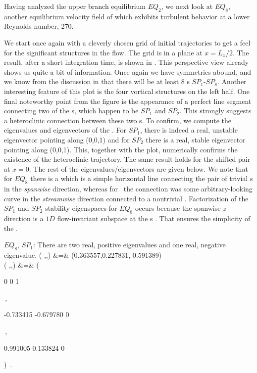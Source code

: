 \documentclass[letter,12pt,openany]{article}
\begin{document}
Having analyzed the upper branch equilibrium $EQ_2$, we next look at 
$EQ_8$, another equilibrium velocity field of {\pCf} which exhibits 
turbulent behavior at a lower Reynolds number, 270.


We start once again with a cleverly chosen grid of initial trajectories 
to get a feel for the significant structures in the flow. The grid is in 
a plane at $x = L_{x}/2$. The result, after a short integration time, is 
shown in . This perspective view already shows 
us quite a bit of information. Once again we have symmetries abound, and 
we know from the discussion in  that there will be 
at least 8 {\stagp}s $SP_1$-$SP_8$.  Another interesting feature of this 
plot is the four vortical structures on the left half. One final 
noteworthy point from the figure is the appearance of a perfect line 
segment connecting two of the {\stagp}s, which happen to be $SP_1$ and 
$SP_2$. This strongly suggests a heteroclinic connection between these 
two \stagp s. To confirm, we compute the eigenvalues and eigenvectors of 
the \velgradmat. For $SP_1$, there is indeed a real, unstable eigenvector 
pointing along (0,0,1) and for $SP_2$ there is a real, stable eigenvector 
pointing along (0,0,1). This, together with the plot, numerically 
confirms the existence of the heteroclinic trajectory. The same result  
holds for the shifted pair at $x = 0$. The rest of the 
eigenvalues/eigenvectors are given below. We note that for $EQ_8$ there 
is a {\hc} which is a simple horizontal line connecting the pair of 
trivial \stagp s in the \textit{spanwise} direction, whereas for \tUB\ 
the connection was some arbitrary-looking curve in the 
\textit{streamwise} direction connected to a nontrivial \stagp. 
Factorization of the $SP_1$ and $SP_2$ stability eigenspaces for $EQ_8$ 
occurs because the spanwise $z$ direction is a $1D$ flow-invariant 
subspace at the \stagp s \cite{SiCvi10}. That ensures the simplicity of 
the \hec. 

$EQ_8$, $SP_1$: There are two real, positive eigenvalues
 and one real, negative eigenvalue.
\bea
\left(
    \eigExp[1],\eigExp[2],\eigExp[3]
\right) &=&
      (0.363557,0.227831,-0.591389)
\label{E8SP1} \\
\left(
    \jEigvec[1],\jEigvec[2],\jEigvec[3]
\right) &=&
\left(
    \begin{pmatrix}
             {0} \cr
             {0} \cr
             {1}
    \end{pmatrix} \,,
    \begin{pmatrix}
             {-0.733415} \cr
             {-0.679780} \cr
             {0}
    \end{pmatrix} \,,
    \begin{pmatrix}
             {0.991005} \cr
             {0.133824} \cr
             {0}
    \end{pmatrix}
\right) \,.
\nnu
\eea
\end{document}
